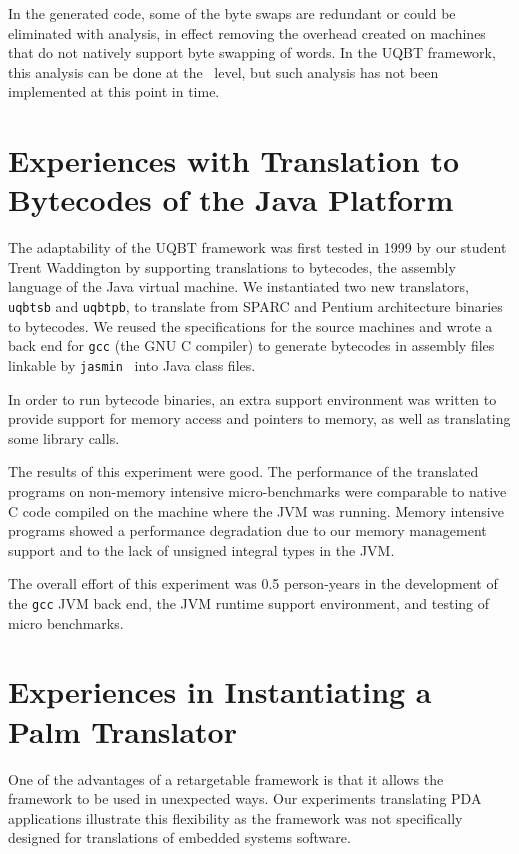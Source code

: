 In the generated code, some of the byte swaps are redundant or could
be eliminated with analysis, in effect removing the overhead created
on machines that do not natively support byte swapping of words.
In the UQBT framework, this analysis can be done at the \hrtl\ level, 
but such analysis has not been implemented at this point in time.


\section{Experiences with Translation to Bytecodes of the Java Platform}
The adaptability of the UQBT framework was first tested in 1999 by our 
student Trent Waddington by supporting translations to bytecodes, the 
assembly language of the Java virtual machine. 
We instantiated two new translators, \texttt{uqbtsb} and \texttt{uqbtpb}, 
to translate from SPARC and Pentium architecture binaries to bytecodes. 
We reused the specifications for the source machines and 
wrote a back end for \texttt{gcc} (the GNU C compiler) to generate 
bytecodes in assembly files linkable by \texttt{jasmin}~\cite{Meye97} 
into Java class files. 

In order to run bytecode binaries, an extra support environment 
was written to provide support for memory access and pointers 
to memory, as well as translating some library calls.

The results of this experiment were good.  The performance of 
the translated programs on non-memory intensive micro-benchmarks 
were comparable to native C code compiled on the machine where the 
JVM was running.  Memory intensive programs showed a performance 
degradation due to our memory management support and to the 
lack of unsigned integral types in the JVM.   

The overall effort of this experiment was 0.5 person-years in 
the development of the \texttt{gcc} JVM back end, the JVM runtime 
support environment, and testing of micro benchmarks. 
 

\section{Experiences in Instantiating a Palm Translator} 
One of the advantages of a retargetable framework is that it 
allows the framework to be used in unexpected ways.
Our experiments translating PDA applications illustrate this flexibility
as the framework was not specifically designed for translations 
of embedded systems software.

